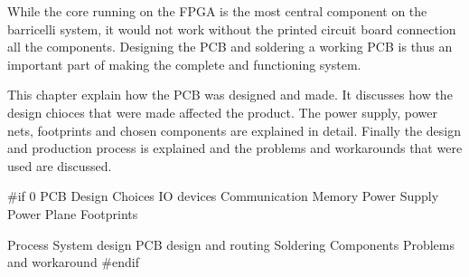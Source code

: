 
While the core running on the FPGA is the most central component on the barricelli system, it would not work without the printed circuit board connection all the components.
Designing the PCB and soldering a working PCB is thus an important part of making the complete and functioning system.

This chapter explain how the PCB was designed and made.
It discusses how the design chioces that were made affected the product.
The power supply, power nets, footprints and chosen components are explained in detail.
Finally the design and production process is explained and the problems and workarounds that were used are discussed.

 \label{pcb:section:design_choices}

 \label{pcb:section:power_supply}

 \label{pcb:section:power_plane}

 \label{pcb:section:footprints}

 \label{pcb:section:process}

 \label{pcb:section:components}

 \label{pcb:section:problems_and_workaround}

\#if 0
PCB
    Design Choices
        IO devices
        Communication
        Memory
    Power Supply
    Power Plane
    Footprints
        
    Process
        System design
        PCB design and routing
        Soldering
    Components
    Problems and workaround
\#endif
